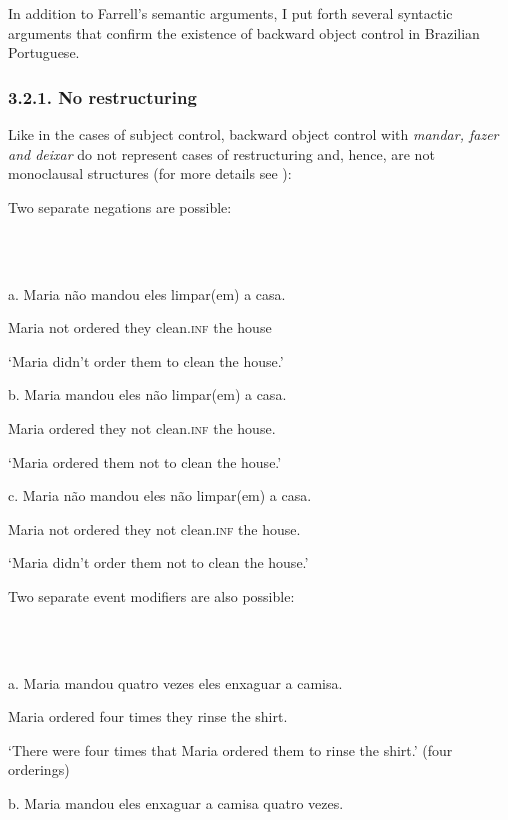 \documentclass[output=paper]{langsci/langscibook}
\begin{document}
In addition to Farrell’s semantic arguments, I put forth several syntactic arguments that confirm the existence of backward object control in Brazilian Portuguese.

\subsubsection{ 3.2.1. No restructuring}

Like in the cases of subject control, backward object control with \textit{mandar, fazer and deixar}\textbf{ }do not represent cases of restructuring and, hence, are not monoclausal structures (for more details see \citealt{Cyrino2010}):

Two separate negations are possible:

\ea%
    \label{ex:moreno:14}
    \gll\\
        \\
    \glt
    \z

          a.  Maria não   mandou   eles limpar(em)   a casa.

    Maria not   ordered   they clean.\textsc{inf}   the house

    ‘Maria didn’t order them to clean the house.’

  b.  Maria mandou   eles não   limpar(em)   a casa.

    Maria ordered   they not   clean.\textsc{inf}   the house.

    ‘Maria ordered them not  to clean  the house.’

  c.  Maria não   mandou   eles não limpar(em)   a casa.

    Maria  not   ordered   they not clean.\textsc{inf}   the house.

    ‘Maria didn’t order them not to clean the house.’

Two separate event modifiers are also possible:

\ea%
    \label{ex:moreno:15}
    \gll\\
        \\
    \glt
    \z

          a.  Maria mandou   quatro vezes  eles enxaguar   a camisa.

    Maria ordered    four    times  they rinse   the shirt.

‘There were four times that Maria ordered them to rinse the shirt.’ (four orderings)

  b.  Maria mandou eles   enxaguar   a camisa   quatro vezes.
\end{document}
